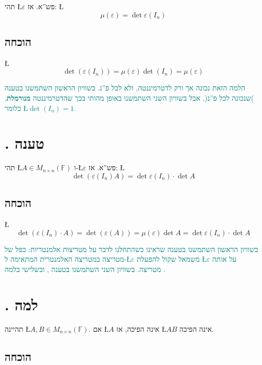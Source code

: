 \documentclass[english,hebrew]{article}
\begin{document}
תהי \L{$\varepsilon$} פש\textquotedblright א. אז: \L{%
\[
\mu(\varepsilon)=\det\varepsilon(I_{n})
\]
}%

\subsection{הוכחה}

\L{%
\[
\det(\varepsilon(I_{n}))=\mu(\varepsilon)\det(I_{n})=\mu(\varepsilon)
\]
}%

\textcolor{teal}{הלמה הזאת נכונה אך ורק לדטרמיננטה, ולא לכל פ\textquotedblright נ.
בשוויון הראשון השתמשנו בטענה }\textcolor{teal}{{}\endL}\textcolor{teal}{{}
)שנכונה לכל פ\textquotedblright נ(, אבל בשוויון השני השתמשנו באופן
מהותי בכך שהדטרמיננטה }\textbf{\textcolor{teal}{מנורמלת}}\textcolor{teal}{,
כלומר \L{$\det(I_{n})=1$}.}

\section{{\endL}. טענה}

תהי \L{$A\in M_{n\times n}(\mathbb{F})$} ו-\L{$\varepsilon$} פש\textquotedblright א.
אז: \L{%
\[
\det(\varepsilon(I_{n})A)=\det\varepsilon(I_{n})\cdot\det A
\]
}%

\subsection{הוכחה}

\L{%
\[
\det(\varepsilon(I_{n})\cdot A)=\det(\varepsilon(A))=\mu(\varepsilon)\det A=\det\varepsilon(I_{n})\cdot\det A
\]
}%

\textcolor{teal}{בשוויון הראשון השתמשנו בטענה שראינו כשהתחלנו לדבר
על מטריצות אלמנטריות: כפל של מטריצה במטריצה האלמנטרית המתאימה ל-\L{$\varepsilon$}
משמאל שקול להפעלת \L{$\varepsilon$} על אותה מטריצה. בשוויון השני
השתמשנו בטענה }\textcolor{teal}{{}\endL}\textcolor{teal}{,
ובשלישי בלמה }\textcolor{teal}{{}\endL}\textcolor{teal}{.}

\section{{\endL}. למה}

תהיינה \L{$A,B\in M_{n\times n}(\mathbb{F})$}. אם \L{$A$} אינה הפיכה,
אז \L{$AB$} אינה הפיכה.

\subsection{הוכחה}
\end{document}
